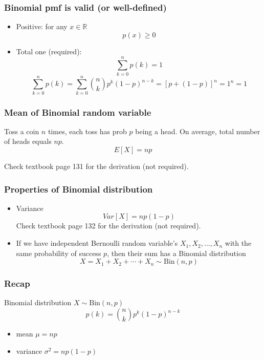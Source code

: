 \documentclass[slidestop,compress,mathserif]{beamer}
\begin{document}
\begin{frame}\frametitle{Binomial pmf is valid (or well-defined)} %

\begin{itemize}
\item Positive: for any $x \in \mathbb{R}$
\[p(x) \geq 0\]
\item Total one ({\color{red}required}):
 \[\sum_{k = 0}^n p(k) = 1\]
$$\sum_{k = 0}^n p(k) = \sum_{k = 0}^n {n \choose k} p^k(1-p)^{n-k} = [p+(1-p)]^n = 1^n = 1$$

\end{itemize}

\end{frame}
\begin{frame}\frametitle{Mean of Binomial random variable}

Toss a coin $n$ times, each toss has prob $p$ being a head. On average,
total number of heads equals $np$.\\

\[E[X] = np \]

Check textbook page 131 for the derivation ({\color{red}not required}).

\end{frame}

\begin{frame}\frametitle{Properties of Binomial distribution}

\begin{itemize}
\item Variance
\[Var[X] = np(1-p) \]
Check textbook page 132 for the derivation ({\color{red}not required}).


\vfill
\item If we have independent Bernoulli random variable's $X_1, X_2, \ldots, X_n$ with the same probability of success $p$, then
their sum has a Binomial distribution
\[
X = X_1 + X_2 + \cdots + X_n \sim \text{Bin}(n, p)
\]


\end{itemize}

\end{frame}

\begin{frame}\frametitle{Recap}

Binomial distribution $X \sim \text{Bin}(n,p) $
\[ p(k) = {n \choose k} p^k(1-p)^{n-k}\]
\begin{itemize}
\item mean $\mu = np$
\item variance $\sigma^2 = np(1-p)$
\end{itemize}


\end{frame}
\end{document}
